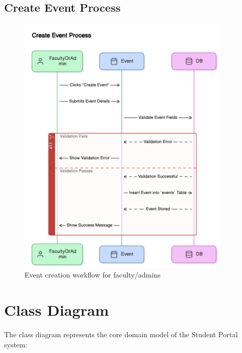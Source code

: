 \subsection{Create Event Process}
\begin{figure}[H]
    \centering
    \includegraphics[width=0.9\textwidth]{images/sequence_diagrams/create_event_process.png}
    \caption{Event creation workflow for faculty/admins}
    \label{fig:create_event}
\end{figure}

\vspace{3cm}

\section{Class Diagram}
The class diagram represents the core domain model of the Student Portal system:

